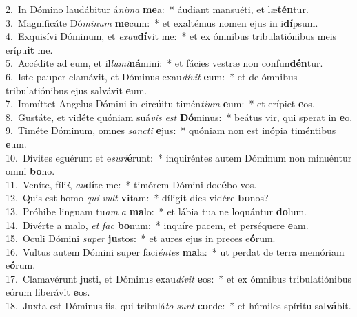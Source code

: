{2.~}In Dómino laudábitur á\textit{ni}\textit{ma} \textbf{me}a:~* áudiant mansuéti, et læ\textbf{tén}tur.\\
{3.~}Magnificáte Dó\textit{mi}\textit{num} \textbf{me}cum:~* et exaltémus nomen ejus in i\textbf{dí}psum.\\
{4.~}Exquisívi Dóminum, et \textit{e}\textit{xau}\textbf{dí}vit me:~* et ex ómnibus tribulatiónibus meis erípu\textbf{it} me.\\
{5.~}Accédite ad eum, et il\textit{lu}\textit{mi}\textbf{ná}mini:~* et fácies vestræ non confun\textbf{dén}tur.\\
{6.~}Iste pauper clamávit, et Dóminus exau\textit{dí}\textit{vit} \textbf{e}um:~* et de ómnibus tribulatiónibus ejus salvávit \textbf{e}um.\\
{7.~}Immíttet Angelus Dómini in circúitu timén\textit{ti}\textit{um} \textbf{e}um:~* et erípiet \textbf{e}os.\\
{8.~}Gustáte, et vidéte quóniam suá\textit{vis} \textit{est} \textbf{Dó}minus:~* beátus vir, qui sperat in \textbf{e}o.\\
{9.~}Timéte Dóminum, omnes \textit{san}\textit{cti} \textbf{e}jus:~* quóniam non est inópia timéntibus \textbf{e}um.\\
{10.~}Dívites eguérunt et e\textit{su}\textit{ri}\textbf{é}runt:~* inquiréntes autem Dóminum non minuéntur omni \textbf{bo}no.\\
{11.~}Veníte, fíli\textit{i}, \textit{au}\textbf{dí}te me:~* timórem Dómini do\textbf{cé}bo vos.\\
{12.~}Quis est homo \textit{qui} \textit{vult} \textbf{vi}tam:~* díligit dies vidére \textbf{bo}nos?\\
{13.~}Próhibe linguam tu\textit{am} \textit{a} \textbf{ma}lo:~* et lábia tua ne loquántur \textbf{do}lum.\\
{14.~}Divérte a malo, \textit{et} \textit{fac} \textbf{bo}num:~* inquíre pacem, et perséquere \textbf{e}am.\\
{15.~}Oculi Dómini \textit{su}\textit{per} \textbf{ju}stos:~* et aures ejus in preces e\textbf{ó}rum.\\
{16.~}Vultus autem Dómini super faci\textit{én}\textit{tes} \textbf{ma}la:~* ut perdat de terra memóriam e\textbf{ó}rum.\\
{17.~}Clamavérunt justi, et Dóminus exau\textit{dí}\textit{vit} \textbf{e}os:~* et ex ómnibus tribulatiónibus eórum liberávit \textbf{e}os.\\
{18.~}Juxta est Dóminus iis, qui tribulá\textit{to} \textit{sunt} \textbf{cor}de:~* et húmiles spíritu sal\textbf{vá}bit.\\

